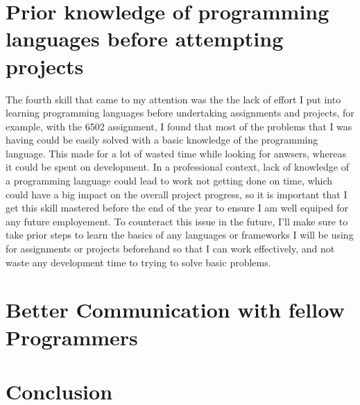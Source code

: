 \documentclass{scrartcl}
\begin{document}
\section{Prior knowledge of programming languages before attempting projects}
The fourth skill that came to my attention was the the lack of effort I put into learning programming languages before undertaking assignments and projects, for example, with the 6502 assignment, I found that most of the problems that I was having could be easily solved with a basic knowledge of the programming language. This made for a lot of wasted time while looking for anwsers, whereas it could be spent on development. In a professional context, lack of knowledge of a programming language could lead to work not getting done on time, which could have a big impact on the overall project progress, so it is important that I get this skill mastered before the end of the year to ensure I am well equiped for any future employement. To counteract this issue in the future, I'll make sure to take prior steps to learn the basics of any languages or frameworks I will be using for assignments or projects beforehand so that I can work effectively, and not waste any development time to trying to solve basic problems. 



\section{Better Communication with fellow Programmers}


\section{Conclusion}








\end{document}

